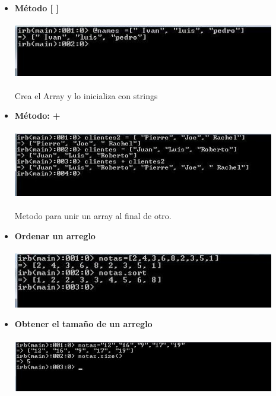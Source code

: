 \documentclass[11pt]{article} %
\begin{document}
\begin{itemize}
      \item {\bf Método [ ]} \\\\
    \includegraphics[width=0.9\textwidth]{./imagenes/crear_2}\\\\
Crea el Array y lo inicializa con strings\\
      \item {\bf Método: +}\\\\
    \includegraphics[width=0.9\textwidth]{./imagenes/suma}\\\\
        Metodo para unir  un array al final de otro.

     \item {\bf Ordenar un arreglo}\\\\
    \includegraphics[width=0.9\textwidth]{./imagenes/ordenar}\\

    \item  {\bf Obtener el tamaño de un arreglo}\\\\
        \includegraphics[width=0.9\textwidth]{./imagenes/size}\\\\


\end{itemize}
\end{document}
